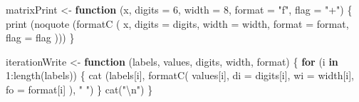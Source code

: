 \documentclass[
  12pt,
  letterpaper,
  DIV=11,
  numbers=noendperiod]{scrreprt}
\newenvironment{Shaded}{\begin{snugshade}}{\end{snugshade}}
\newcommand{\AttributeTok}[1]{\textcolor[rgb]{0.40,0.45,0.13}{#1}}
\newcommand{\ControlFlowTok}[1]{\textcolor[rgb]{0.00,0.23,0.31}{\textbf{#1}}}
\newcommand{\DecValTok}[1]{\textcolor[rgb]{0.68,0.00,0.00}{#1}}
\newcommand{\FunctionTok}[1]{\textcolor[rgb]{0.28,0.35,0.67}{#1}}
\newcommand{\NormalTok}[1]{\textcolor[rgb]{0.00,0.23,0.31}{#1}}
\newcommand{\OtherTok}[1]{\textcolor[rgb]{0.00,0.23,0.31}{#1}}
\newcommand{\SpecialCharTok}[1]{\textcolor[rgb]{0.37,0.37,0.37}{#1}}
\newcommand{\StringTok}[1]{\textcolor[rgb]{0.13,0.47,0.30}{#1}}
\theoremstyle{remark}
\begin{document}
\begin{Shaded}
\begin{Highlighting}[]
\NormalTok{matrixPrint }\OtherTok{\textless{}{-}} \ControlFlowTok{function}\NormalTok{ (x,}
                    \AttributeTok{digits =} \DecValTok{6}\NormalTok{,}
                    \AttributeTok{width =} \DecValTok{8}\NormalTok{,}
                    \AttributeTok{format =} \StringTok{"f"}\NormalTok{,}
                    \AttributeTok{flag =} \StringTok{"+"}\NormalTok{) \{}
  \FunctionTok{print}\NormalTok{ (}\FunctionTok{noquote}\NormalTok{ (}\FunctionTok{formatC}\NormalTok{ (}
\NormalTok{    x,}
    \AttributeTok{digits =}\NormalTok{ digits,}
    \AttributeTok{width =}\NormalTok{ width,}
    \AttributeTok{format =}\NormalTok{ format,}
    \AttributeTok{flag =}\NormalTok{ flag}
\NormalTok{  )))}
\NormalTok{\}}

\NormalTok{iterationWrite }\OtherTok{\textless{}{-}} \ControlFlowTok{function}\NormalTok{ (labels, values, digits, width, format) \{}
  \ControlFlowTok{for}\NormalTok{ (i }\ControlFlowTok{in} \DecValTok{1}\SpecialCharTok{:}\FunctionTok{length}\NormalTok{(labels)) \{}
    \FunctionTok{cat}\NormalTok{ (labels[i],}
         \FunctionTok{formatC}\NormalTok{(}
\NormalTok{           values[i],}
           \AttributeTok{di =}\NormalTok{ digits[i],}
           \AttributeTok{wi =}\NormalTok{ width[i],}
           \AttributeTok{fo =}\NormalTok{ format[i]}
\NormalTok{         ),}
         \StringTok{" "}\NormalTok{)}
\NormalTok{  \}}
  \FunctionTok{cat}\NormalTok{(}\StringTok{"}\SpecialCharTok{\textbackslash{}n}\StringTok{"}\NormalTok{)}
\NormalTok{\}}


\end{Highlighting}
\end{Shaded}
\end{document}
